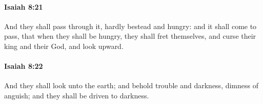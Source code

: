 		\paragraph{Isaiah 8:21} %
			\label{ISAIAH-8-21}

			And they shall pass through it, hardly bestead and hungry: and it shall come to pass, that when they shall be hungry, they shall fret themselves, and curse their king and their God, and look upward.


		\paragraph{Isaiah 8:22} %
			\label{ISAIAH-8-22}

			And they shall look unto the earth; and behold trouble and darkness, dimness of anguish; and they shall be driven to darkness.

